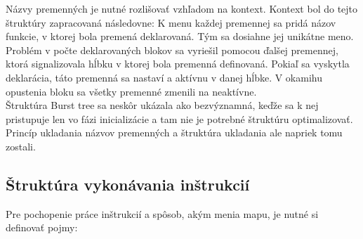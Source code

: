 Názvy premenných je nutné rozlišovať vzhľadom na kontext. Kontext bol do tejto štruktúry zapracovaná následovne: K menu každej premennej sa pridá názov funkcie, v ktorej bola premená deklarovaná. Tým sa dosiahne jej unikátne meno. Problém v počte deklarovaných blokov sa vyriešil pomocou ďalšej premennej, ktorá signalizovala hĺbku v ktorej bola premenná definovaná. Pokiaľ sa vyskytla deklarácia, táto premenná sa nastaví a aktívnu v danej hĺbke. V okamihu opustenia bloku sa všetky premenné zmenili na neaktívne. \\
Štruktúra Burst tree sa neskôr ukázala ako bezvýznamná, keďže sa k nej pristupuje len vo fázi inicializácie a tam nie je potrebné štruktúru optimalizovať. Princíp ukladania názvov premenných a štruktúra ukladania ale napriek tomu zostali. \\
\subsection{Štruktúra vykonávania inštrukcií}
Pre pochopenie práce inštrukcií a spôsob, akým menia mapu, je nutné si definovať pojmy:
